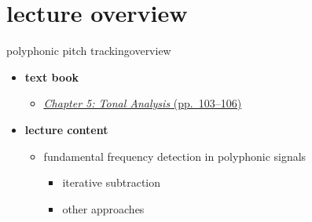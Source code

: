 

\subtitle{Part 6.4: Polyphonic fundamental frequency detection}


	

    \section[overview]{lecture overview}
        \begin{frame}{polyphonic pitch tracking}{overview}
            \begin{itemize}
                \item   \textbf{text book}  
                    \begin{itemize}
                        \item   \href{http://ieeexplore.ieee.org/xpl/articleDetails.jsp?tp=&arnumber=6331122&}{\underline{\textit{Chapter 5: Tonal Analysis} (pp.~103--106)}}
                    \end{itemize}
                \bigskip
                \item<2->   \textbf{lecture content}
                    \begin{itemize}
                        \item<2->   fundamental frequency detection in polyphonic signals
                            \begin{itemize}
                                \item   iterative subtraction
                                \item   other approaches
                            \end{itemize}
                    \end{itemize}
            \end{itemize}
        \end{frame}

